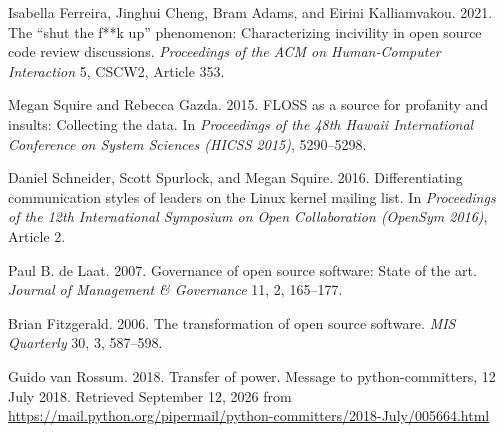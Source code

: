 Isabella Ferreira, Jinghui Cheng, Bram Adams, and Eirini Kalliamvakou. 2021. The ``shut the f**k up'' phenomenon: Characterizing incivility in open source code review discussions. \emph{Proceedings of the ACM on Human-Computer Interaction} 5, CSCW2, Article 353.

Megan Squire and Rebecca Gazda. 2015. FLOSS as a source for profanity and insults: Collecting the data. In \emph{Proceedings of the 48th Hawaii International Conference on System Sciences (HICSS 2015)}, 5290--5298.

Daniel Schneider, Scott Spurlock, and Megan Squire. 2016. Differentiating communication styles of leaders on the Linux kernel mailing list. In \emph{Proceedings of the 12th International Symposium on Open Collaboration (OpenSym 2016)}, Article 2.

Paul B. de Laat. 2007. Governance of open source software: State of the art. \emph{Journal of Management \& Governance} 11, 2, 165--177.

Brian Fitzgerald. 2006. The transformation of open source software. \emph{MIS Quarterly} 30, 3, 587--598.

Guido van Rossum. 2018. Transfer of power. Message to python-committers, 12 July 2018. Retrieved September 12, 2026 from \url{https://mail.python.org/pipermail/python-committers/2018-July/005664.html}
